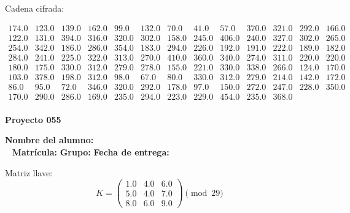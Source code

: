 \documentclass[12pt]{article}
\begin{document}
Cadena cifrada:
\begin{center}
$\begin{array}{lllllllllllll}
174.0 & 123.0 & 139.0 & 162.0 & 99.0 & 132.0 & 70.0 & 41.0 & 57.0 & 370.0 & 321.0 & 292.0 & 166.0\\
122.0 & 131.0 & 394.0 & 316.0 & 320.0 & 302.0 & 158.0 & 245.0 & 406.0 & 240.0 & 327.0 & 302.0 & 265.0\\
254.0 & 342.0 & 186.0 & 286.0 & 354.0 & 183.0 & 294.0 & 226.0 & 192.0 & 191.0 & 222.0 & 189.0 & 182.0\\
284.0 & 241.0 & 225.0 & 322.0 & 313.0 & 270.0 & 410.0 & 360.0 & 340.0 & 274.0 & 311.0 & 220.0 & 220.0\\
180.0 & 175.0 & 330.0 & 312.0 & 279.0 & 278.0 & 155.0 & 221.0 & 330.0 & 338.0 & 266.0 & 124.0 & 170.0\\
103.0 & 378.0 & 198.0 & 312.0 & 98.0 & 67.0 & 80.0 & 330.0 & 312.0 & 279.0 & 214.0 & 142.0 & 172.0\\
86.0 & 95.0 & 72.0 & 346.0 & 320.0 & 292.0 & 178.0 & 97.0 & 150.0 & 272.0 & 247.0 & 228.0 & 350.0\\
170.0 & 290.0 & 286.0 & 169.0 & 235.0 & 294.0 & 223.0 & 229.0 & 454.0 & 235.0 & 368.0\\
\end{array}$
\end{center}

\newpage


\textbf{Proyecto 055}

\textbf{Nombre del alumno:} \underline{\hspace{13cm}}\\\
\vspace{1cm}
\textbf{Matrícula:} \underline{\hspace{4cm}} \hspace{1cm}
\textbf{Grupo:} \underline{\hspace{2cm}}
\textbf{Fecha de entrega:} \underline{\hspace{2cm}}

\medskip

Matriz llave:
\[
K = \begin{pmatrix}
1.0 & 4.0 & 6.0\\
5.0 & 4.0 & 7.0\\
8.0 & 6.0 & 9.0
\end{pmatrix} \pmod{29}
\]
\end{document}
